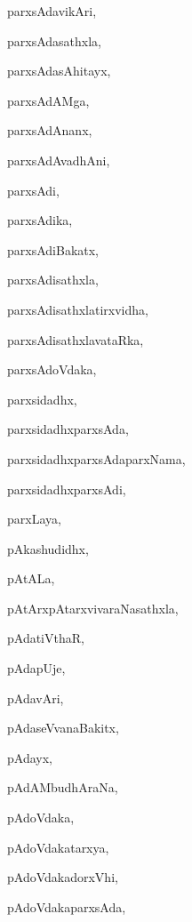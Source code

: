 \begin{multicols}{2}
{parxsAdavikAri}, \pageref{parxsAdavikAri2}

{parxsAdasathxla}, \pageref{parxsAdasathxla}

{parxsAdasAhitayx}, \pageref{parxsAdasAhitayx}

{parxsAdAMga}, \pageref{parxsAdAMga}

{parxsAdAnanx}, \pageref{parxsAdAnanx}

{parxsAdAvadhAni}, \pageref{parxsAdAvadhAni}

{parxsAdi}, \pageref{parxsAdi}

{parxsAdika}, \pageref{parxsAdika}

{parxsAdiBakatx}, \pageref{parxsAdiBakatx}

{parxsAdisathxla}, \pageref{parxsAdisathxla}

{parxsAdisathxlatirxvidha}, \pageref{parxsAdisathxlatirxvidha}

{parxsAdisathxlavataRka}, \pageref{parxsAdisathxlavataRka}

{parxsAdoVdaka}, \pageref{parxsAdoVdaka}

{parxsidadhx}, \pageref{parxsidadhx}

{parxsidadhxparxsAda}, \pageref{parxsidadhxparxsAda}

{parxsidadhxparxsAdaparxNama}, \pageref{parxsidadhxparxsAdaparxNama}

{parxsidadhxparxsAdi}, \pageref{parxsidadhxparxsAdi}

{parxLaya}, \pageref{parxLaya}

{pAkashudidhx}, \pageref{pAkashudidhx}

{pAtALa}, \pageref{pAtALa}

{pAtArxpAtarxvivaraNasathxla}, \pageref{pAtArxpAtarxvivaraNasathxla}

{pAdatiVthaR}, \pageref{pAdatiVthaR}

{pAdapUje}, \pageref{pAdapUje}

{pAdavAri}, \pageref{pAdavAri}

{pAdaseVvanaBakitx}, \pageref{pAdaseVvanaBakitx}

{pAdayx}, \pageref{pAdayx}

{pAdAMbudhAraNa}, \pageref{pAdAMbudhAraNa}

{pAdoVdaka}, \pageref{pAdoVdaka}

{pAdoVdakatarxya}, \pageref{pAdoVdakatarxya}

{pAdoVdakadorxVhi}, \pageref{pAdoVdakadorxVhi}

{pAdoVdakaparxsAda}, \pageref{pAdoVdakaparxsAda}


\end{multicols}
